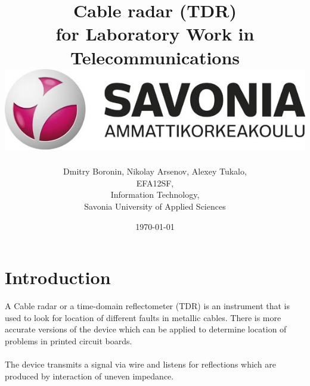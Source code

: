 \documentclass[english]{article}
\date{}
\begin{document}
\title{\vspace{2in}Cable radar (TDR)\\
\small for Laboratory Work in Telecommunications\\
\vspace{0.5in}\includegraphics{savonia.jpg}}

\nopagebreak
\maketitle


\vspace{3in}

\author{
\begin{flushright}
Dmitry Boronin, Nikolay Arsenov, Alexey Tukalo,\\
EFA12SF,\\
Information Technology,\\
Savonia University of Applied Sciences
\end{flushright}
}

\date{\today}
\thispagestyle{empty}

\newpage
\setcounter{page}{1}
\setcounter{tocdepth}{2}
\tableofcontents

\newpage


\section{Introduction}
A Cable radar or a time-domain reflectometer (TDR) is an instrument that is used to look for location of different faults in metallic cables. There is more accurate versions of the device which can be applied to determine location of problems in printed circuit boards.\\\\
The device transmits a signal via wire and listens for reflections which are produced by interaction of uneven impedance.
\end{document}
